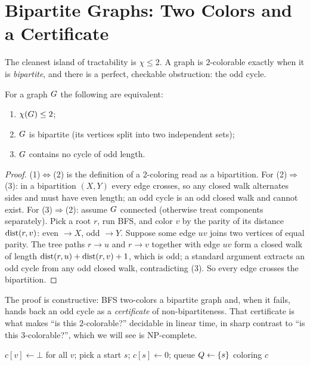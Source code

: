 \section{Bipartite Graphs: Two Colors and a Certificate}
\label{ch28:bipartite}

The cleanest island of tractability is $\chi\le 2$. A graph is $2$-colorable
exactly when it is \emph{bipartite}, and there is a perfect, checkable obstruction:
the odd cycle.

\begin{theorem}
\label{ch28:thm-bipartite}
For a graph $G$ the following are equivalent:
\begin{enumerate}[label=\textup{(\arabic*)}]
  \item $\chi(G)\le 2$;
  \item $G$ is bipartite (its vertices split into two independent sets);
  \item $G$ contains no cycle of odd length.
\end{enumerate}
\end{theorem}

\begin{proof}
(1)$\Leftrightarrow$(2) is the definition of a $2$-coloring read as a bipartition.
For (2)$\Rightarrow$(3): in a bipartition $(X,Y)$ every edge crosses, so any closed
walk alternates sides and must have even length; an odd cycle is an odd closed walk
and cannot exist. For (3)$\Rightarrow$(2): assume $G$ connected (otherwise treat
components separately). Pick a root $r$, run BFS, and color $v$ by the parity of its
distance $\operatorname{dist}(r,v)$: even $\to X$, odd $\to Y$. Suppose some edge $uv$ joins two
vertices of equal parity. The tree paths $r\!\to\!u$ and $r\!\to\!v$ together with
edge $uv$ form a closed walk of length $\operatorname{dist}(r,u)+\operatorname{dist}(r,v)+1$, which is odd; a
standard argument extracts an odd cycle from any odd closed walk, contradicting
(3). So every edge crosses the bipartition.
\end{proof}

The proof is constructive: BFS two-colors a bipartite graph and, when it fails,
hands back an odd cycle as a \emph{certificate} of non-bipartiteness. That
certificate is what makes ``is this $2$-colorable?'' decidable in linear time, in
sharp contrast to ``is this $3$-colorable?'', which we will see is NP-complete.

\begin{algorithm}[H]
\caption{\textsc{TwoColor}$(\Gph)$ -- BFS bipartiteness test and coloring}
\label{ch28:alg-twocolor}
$c[v]\leftarrow \bot$ for all $v$; pick a start $s$; $c[s]\leftarrow 0$; queue $Q\leftarrow\{s\}$\;
\Return coloring $c$\;
\end{algorithm}

